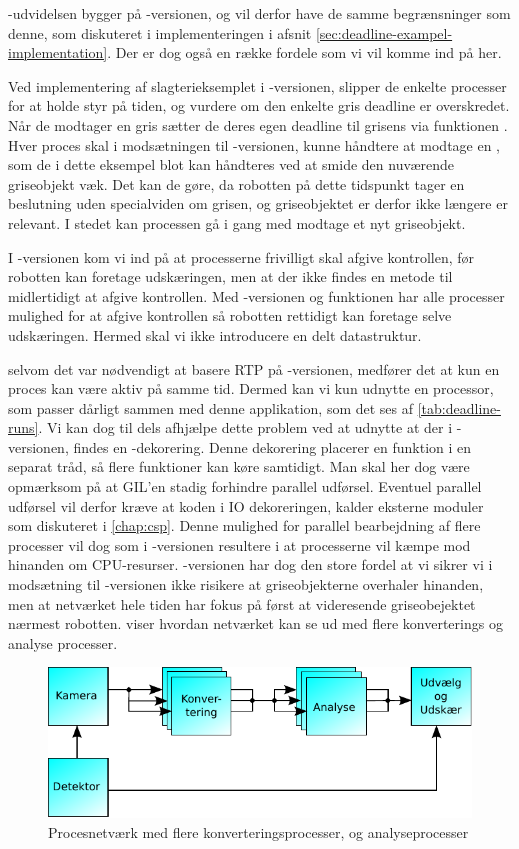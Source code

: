 -udvidelsen bygger på -versionen, og vil derfor have de samme begrænsninger som denne, som diskuteret i implementeringen i afsnit \cref{sec:deadline-exampel-implementation}. Der er dog også en række fordele som vi vil komme ind på her.

Ved implementering af slagterieksemplet i -versionen, slipper de enkelte processer for at holde styr på tiden, og vurdere om den enkelte gris deadline er overskredet. Når de modtager en gris sætter de deres egen deadline til grisens via funktionen .  Hver proces skal i modsætningen til -versionen, kunne håndtere at modtage en , som de i dette eksempel blot kan håndteres ved at smide den nuværende griseobjekt væk. Det kan de gøre, da robotten på dette tidspunkt tager en beslutning uden specialviden om grisen, og griseobjektet er derfor ikke længere er relevant. I stedet kan processen  gå i gang med modtage et nyt griseobjekt.

I -versionen kom vi ind på at processerne frivilligt skal afgive kontrollen, før robotten kan foretage udskæringen, men at der ikke findes en metode til midlertidigt at afgive kontrollen. Med -versionen og funktionen  har alle processer mulighed for at afgive kontrollen så robotten rettidigt kan foretage selve udskæringen. Hermed skal vi ikke introducere en delt datastruktur.
  
selvom det var nødvendigt at basere RTP på  -versionen, medfører det at  kun en proces kan være aktiv på samme tid. Dermed kan vi kun udnytte en processor, som  passer dårligt sammen med denne applikation, som det ses af \cref{tab:deadline-runs}.  Vi kan dog til dels afhjælpe dette problem ved at udnytte at der i -versionen, findes en -dekorering. Denne dekorering placerer en funktion i en separat tråd, så flere funktioner kan køre samtidigt. Man skal her dog være opmærksom på at GIL'en stadig forhindre parallel udførsel. Eventuel parallel udførsel vil derfor kræve at koden i IO dekoreringen, kalder eksterne moduler som diskuteret i \cref{chap:csp}. Denne mulighed for parallel bearbejdning af flere processer vil dog  som i -versionen resultere i at processerne vil kæmpe mod hinanden om CPU-resurser. -versionen har dog den store fordel at vi sikrer vi i modsætning til -versionen ikke risikere at griseobjekterne overhaler hinanden, men at netværket hele tiden har fokus på først at videresende griseobejektet nærmest robotten.  viser hvordan netværket kan se ud med flere konverterings og analyse processer. 

\begin{figure}
 \begin{center}
  \includegraphics[scale=1]{images/pig-network3}
	\caption{Procesnetværk med flere konverteringsprocesser, og analyseprocesser}
	\label{fig:pig-network3}
\end{center}
\end{figure}
